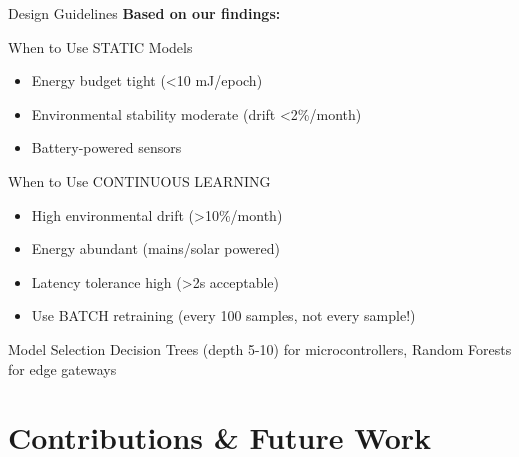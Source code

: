 \documentclass[aspectratio=169]{beamer}
\begin{document}
\begin{frame}{Design Guidelines}
\textbf{Based on our findings:}

\begin{block}{When to Use STATIC Models}
\begin{itemize}
    \item Energy budget tight (<10 mJ/epoch)
    \item Environmental stability moderate (drift <2\%/month)
    \item Battery-powered sensors
\end{itemize}
\end{block}

\begin{block}{When to Use CONTINUOUS LEARNING}
\begin{itemize}
    \item High environmental drift (>10\%/month)
    \item Energy abundant (mains/solar powered)
    \item Latency tolerance high (>2s acceptable)
    \item Use BATCH retraining (every 100 samples, not every sample!)
\end{itemize}
\end{block}

\begin{block}{Model Selection}
Decision Trees (depth 5-10) for microcontrollers, Random Forests for edge gateways
\end{block}
\end{frame}

\section{Contributions \& Future Work}
\end{document}
